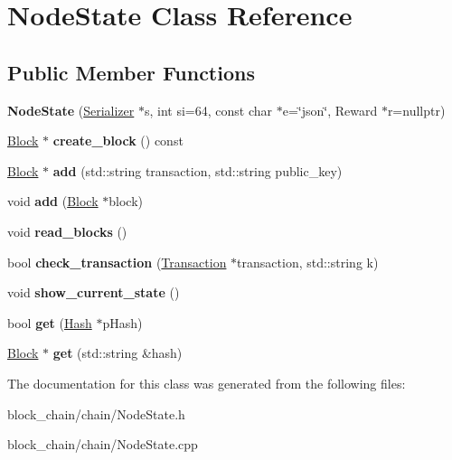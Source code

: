 \hypertarget{classNodeState}{}\section{Node\+State Class Reference}
\label{classNodeState}
\subsection*{Public Member Functions}
\begin{DoxyCompactItemize}
\item 
\mbox{\label{classNodeState_ab8efdcd562f3122b88f0959f5e3b5fed}} 
{\bfseries Node\+State} (\mbox{\hyperlink{classSerializer}{Serializer}} $\ast$s, int si=64, const char $\ast$e=\char`\"{}json\char`\"{}, Reward $\ast$r=nullptr)
\item 
\mbox{\label{classNodeState_a132d657fd8413e9f7eb92237cc66b38c}} 
\mbox{\hyperlink{classBlock}{Block}} $\ast$ {\bfseries create\+\_\+block} () const
\item 
\mbox{\label{classNodeState_a010b7e7cb6d050a2d78962e6532aea9d}} 
\mbox{\hyperlink{classBlock}{Block}} $\ast$ {\bfseries add} (std\+::string transaction, std\+::string public\+\_\+key)
\item 
\mbox{\label{classNodeState_a75e2e94448c4b5579b93b5c2fc0671b9}} 
void {\bfseries add} (\mbox{\hyperlink{classBlock}{Block}} $\ast$block)
\item 
\mbox{\label{classNodeState_ae2e3a8a54ab5276bf469af2cf2107f2b}} 
void {\bfseries read\+\_\+blocks} ()
\item 
\mbox{\label{classNodeState_ad8fac1372753ec35c9fcee92f71d75d6}} 
bool {\bfseries check\+\_\+transaction} (\mbox{\hyperlink{classTransaction}{Transaction}} $\ast$transaction, std\+::string k)
\item 
\mbox{\label{classNodeState_aedd8b10b2ca3f51e5c95b7ebed70464c}} 
void {\bfseries show\+\_\+current\+\_\+state} ()
\item 
\mbox{\label{classNodeState_a771321e4b2c56515ffb79e57da71db30}} 
bool {\bfseries get} (\mbox{\hyperlink{classHash}{Hash}} $\ast$p\+Hash)
\item 
\mbox{\label{classNodeState_a130cf13803990afc44bee6bed8dd4e05}} 
\mbox{\hyperlink{classBlock}{Block}} $\ast$ {\bfseries get} (std\+::string \&hash)
\end{DoxyCompactItemize}


The documentation for this class was generated from the following files\+:\begin{DoxyCompactItemize}
\item 
block\+\_\+chain/chain/Node\+State.\+h\item 
block\+\_\+chain/chain/Node\+State.\+cpp\end{DoxyCompactItemize}
